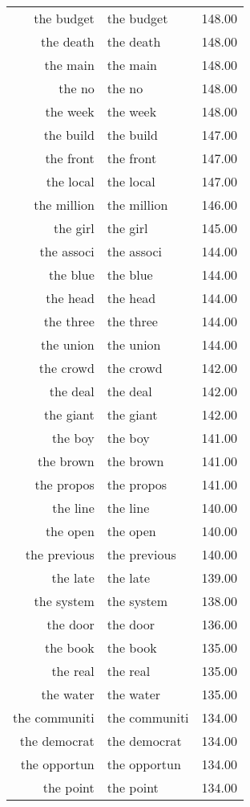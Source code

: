 \begin{table}[ht]
\begin{tabular}{rlr}
  the budget & the budget & 148.00 \\ 
  the death & the death & 148.00 \\ 
  the main & the main & 148.00 \\ 
  the no & the no & 148.00 \\ 
  the week & the week & 148.00 \\ 
  the build & the build & 147.00 \\ 
  the front & the front & 147.00 \\ 
  the local & the local & 147.00 \\ 
  the million & the million & 146.00 \\ 
  the girl & the girl & 145.00 \\ 
  the associ & the associ & 144.00 \\ 
  the blue & the blue & 144.00 \\ 
  the head & the head & 144.00 \\ 
  the three & the three & 144.00 \\ 
  the union & the union & 144.00 \\ 
  the crowd & the crowd & 142.00 \\ 
  the deal & the deal & 142.00 \\ 
  the giant & the giant & 142.00 \\ 
  the boy & the boy & 141.00 \\ 
  the brown & the brown & 141.00 \\ 
  the propos & the propos & 141.00 \\ 
  the line & the line & 140.00 \\ 
  the open & the open & 140.00 \\ 
  the previous & the previous & 140.00 \\ 
  the late & the late & 139.00 \\ 
  the system & the system & 138.00 \\ 
  the door & the door & 136.00 \\ 
  the book & the book & 135.00 \\ 
  the real & the real & 135.00 \\ 
  the water & the water & 135.00 \\ 
  the communiti & the communiti & 134.00 \\ 
  the democrat & the democrat & 134.00 \\ 
  the opportun & the opportun & 134.00 \\ 
  the point & the point & 134.00 \\ 

\end{tabular}
\end{table}
